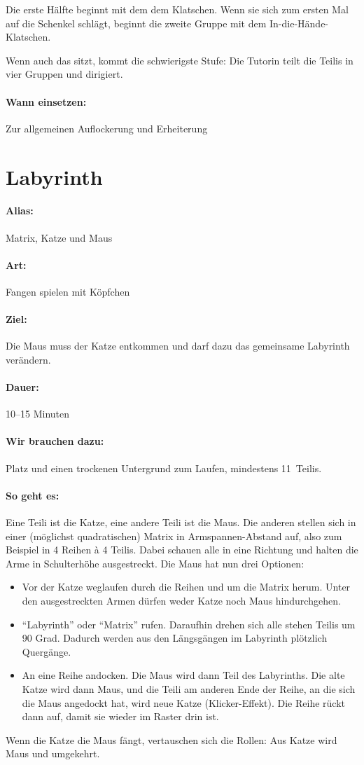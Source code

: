 Die erste Hälfte beginnt mit dem dem Klatschen. Wenn sie sich zum ersten Mal auf die Schenkel schlägt, beginnt die zweite Gruppe mit dem In-die-Hände-Klatschen.

Wenn auch das sitzt, kommt die schwierigste Stufe: Die Tutorin teilt die Teilis in vier Gruppen und dirigiert.
\paragraph{Wann einsetzen:} Zur allgemeinen Auflockerung und Erheiterung

\section{Labyrinth}
\paragraph{Alias:} Matrix, Katze und Maus
\paragraph{Art:} Fangen spielen mit Köpfchen
\paragraph{Ziel:} Die Maus muss der Katze entkommen und darf dazu das gemeinsame Labyrinth verändern.
\paragraph{Dauer:} 10--15 Minuten
\paragraph{Wir brauchen dazu:} Platz und einen trockenen Untergrund zum Laufen, mindestens 11~Teilis.
\paragraph{So geht es:} Eine Teili ist die Katze, eine andere Teili ist die Maus. Die anderen stellen sich in einer (möglichst quadratischen) Matrix in Armspannen-Abstand auf, also zum Beispiel in 4 Reihen \`{a} 4 Teilis. Dabei schauen alle in eine Richtung und halten die Arme in Schulterhöhe ausgestreckt. Die Maus hat nun drei Optionen:
\begin{itemize}
  \item Vor der Katze weglaufen durch die Reihen und um die Matrix herum. Unter den ausgestreckten Armen dürfen weder Katze noch Maus hindurchgehen.
  \item "`Labyrinth"' oder "`Matrix"' rufen. Daraufhin drehen sich alle stehen Teilis um 90 Grad. Dadurch werden aus den Längsgängen im Labyrinth plötzlich Quergänge.
  \item An eine Reihe andocken. Die Maus wird dann Teil des Labyrinths. Die alte Katze wird dann Maus, und die Teili am anderen Ende der Reihe, an die sich die Maus angedockt hat, wird neue Katze (Klicker-Effekt). Die Reihe rückt dann auf, damit sie wieder im Raster drin ist.
\end{itemize}
Wenn die Katze die Maus fängt, vertauschen sich die Rollen: Aus Katze wird Maus und umgekehrt.
